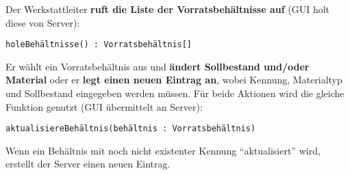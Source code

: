 Der Werkstattleiter \textbf{ruft die Liste der Vorratsbehältnisse auf} (GUI holt diese von Server):

\texttt{holeBehältnisse() : Vorratsbehältnis[]}

Er wählt ein Vorratsbehältnis aus und \textbf{ändert Sollbestand und/oder Material} oder er \textbf{legt einen neuen Eintrag an}, wobei Kennung, Materialtyp und Sollbestand eingegeben werden müssen.
Für beide Aktionen wird die gleiche Funktion genutzt (GUI übermittelt an Server):

\texttt{aktualisiereBehältnis(behältnis : Vorratsbehältnis)}

Wenn ein Behältnis mit noch nicht existenter Kennung "`aktualisiert"' wird, erstellt der Server einen neuen Eintrag.